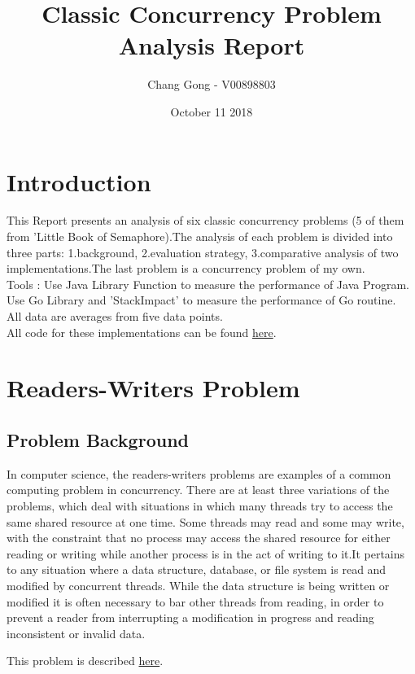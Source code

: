 \documentclass[a4paper,10pt]{article}
\title{Classic Concurrency Problem Analysis Report}
\author{Chang Gong - V00898803}
\date{October 11 2018}
\begin{document}
\maketitle

\section{Introduction}
This Report presents an analysis of six classic concurrency problems (5 of them from 'Little Book of Semaphore).The analysis of each problem is divided into three parts: 1.background, 2.evaluation strategy, 3.comparative analysis of  two implementations.The last problem is a concurrency problem of my own.\\

\noindent Tools : Use Java Library Function to measure the performance of Java Program.
Use Go Library and 'StackImpact' to measure the performance of Go routine.\\
All data are averages from five data points.\\


\noindent All code for these implementations can be found \href{https://github.com/MikasaG/CSC-464}{here}. \newline

\section{Readers-Writers Problem}
\subsection{Problem Background}
In computer science, the readers-writers problems are examples of a common computing problem in concurrency. There are at least three variations of the problems, which deal with situations in which many threads try to access the same shared resource at one time. Some threads may read and some may write, with the constraint that no process may access the shared resource for either reading or writing while another process is in the act of writing to it.It pertains to any situation where a data structure, database, or file system is read and modified by concurrent threads. While the data structure is being written or modified it is often necessary to bar other threads from reading, in order to prevent a reader from interrupting a modification in progress and reading inconsistent or invalid data.

This problem is described \href{http://greenteapress.com/semaphores/LittleBookOfSemaphores.pdf#section.4.2}{here}.
\end{document}
